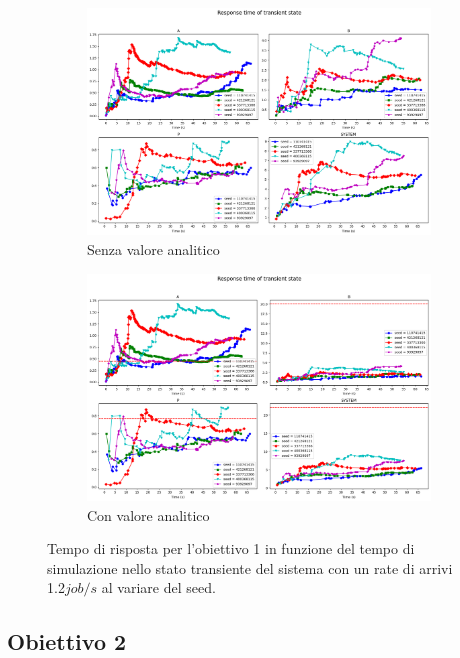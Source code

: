 \begin{figure}
    \centering
    \begin{subfigure}{\linewidth}
        \centering
        \includegraphics[width=0.8\linewidth]{figs/appendices/transient/obj1-transient-rtime.png}
        \caption{Senza valore analitico}
        \label{fig:obj1_transient_simulation}
        \end{subfigure} 
    \begin{subfigure}{\linewidth}
        \centering
        \includegraphics[width=0.8\linewidth]{figs/appendices/transient/obj1-transient-rtime-analitycal.png}
        \caption{Con valore analitico}
        \label{fig:obj1_transient_analitycal}
        \end{subfigure}
    \caption{Tempo di risposta per l'obiettivo 1 in funzione del tempo di simulazione nello stato transiente del sistema con un rate di arrivi 1.2$job/s$ al variare del seed.}
    \label{fig:obj1_transient}
\end{figure}


\subsection{Obiettivo 2}

